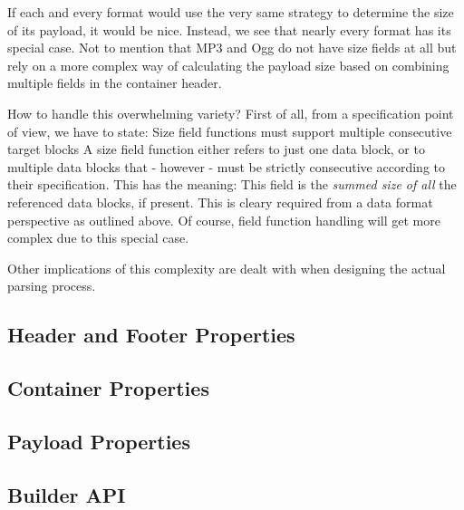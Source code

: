 If each and every format would use the very same strategy to determine the size of its payload, it would be nice. Instead, we see that nearly every format has its special case. Not to mention that MP3 and Ogg do not have size fields at all but rely on a more complex way of calculating the payload size based on combining multiple fields in the container header.

How to handle this overwhelming variety? First of all, from a specification point of view, we have to state:
{%
Size field functions must support multiple consecutive target blocks
}
{%
A size field function either refers to just one data block, or to multiple data blocks that - however - must be strictly consecutive according to their specification. This has the meaning: This field is the \emph{summed size of all} the referenced data blocks, if present.
}
{%
This is cleary required from a data format perspective as outlined above.
}
{%
Of course, field function handling will get more complex due to this special case.
}

Other implications of this complexity are dealt with when designing the actual parsing process.

\subsection{Header and Footer Properties}%
\label{sec:HeaderProperties}%


\subsection{Container Properties}%
\label{sec:ContainerProperties}%


\subsection{Payload Properties}%
\label{sec:PayloadProperties}%

\subsection{Builder API}%
\label{sec:BuilderAPI}%

